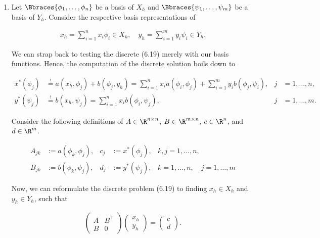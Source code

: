 \begin{solution}

\phantom{}

\begin{enumerate}[label = \textbf{\alph*)}]

  \item Let $\Bbraces{\phi_1, \dots, \phi_n}$ be a basis of $X_h$ and $\Bbraces{\psi_1, \dots, \psi_m}$ be a basis of $Y_h$.
  Consider the respective basis representations of

  \begin{align*}
    x_h = \sum_{i=1}^n x_i \phi_i \in X_h,
    \quad
    y_h = \sum_{i=1}^m y_i \psi_i \in Y_h.
  \end{align*}

  We can strap back to testing the discrete (6.19) merely with our basis functions.
  Hence, the computation of the discrete solution boils down to

  \begin{align*}
    x^\ast(\phi_j) & \stackrel{!}{=} a(x_h, \phi_j) + b(\phi_j, y_h) = \sum_{i=1}^n x_i a(\phi_i, \phi_j) + \sum_{i=1}^m y_i b(\phi_j,\psi_i), & j & = 1, \dots, n, \\
    y^\ast(\psi_j) & \stackrel{!}{=} b(x_h, \psi_j)                  = \sum_{i=1}^n x_i b(\phi_i, \psi_j),                                     & j & = 1, \dots, m.
  \end{align*}

  Consider the following definitions of $A \in \R^{n \times n}$, $B \in \R^{m \times n}$, $c \in \R^n$, and $d \in \R^m$.

  \begin{align*}
    A_{j k} & := a(\phi_k, \phi_j), & c_j & := x^\ast(\phi_j), & k, j = 1, \dots, n, \\
    B_{j k} & := b(\phi_k, \psi_j), & d_j & := y^\ast(\psi_j), & k    = 1, \dots, n, \quad j = 1, \dots, m
  \end{align*}

  Now, we can reformulate the discrete problem (6.19) to finding $x_h \in X_h$ and $y_h \in Y_h$, such that

  \begin{align*}
    \begin{pmatrix}
      A & B^{\top} \\
      B & 0
    \end{pmatrix}
    \begin{pmatrix}
      x_h \\ y_h
    \end{pmatrix}
    =
    \begin{pmatrix}
      c \\ d
    \end{pmatrix}.
  \end{align*}


\end{enumerate}
\end{solution}

